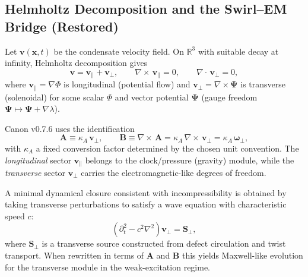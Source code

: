 \documentclass[10pt]{article}
\newcommand{\curlop}{\nabla\times}
\newcommand{\gradop}{\nabla}
\newcommand{\divop}{\nabla\cdot}
\begin{document}
    \subsection{Helmholtz Decomposition and the Swirl--EM Bridge (Restored)}
    \label{sec:helmholtz_em}

    Let $\mathbf{v}(\mathbf{x},t)$ be the condensate velocity field. On $\mathbb{R}^3$ with
    suitable decay at infinity, Helmholtz decomposition gives
    \begin{equation}
        \mathbf{v} = \mathbf{v}_{\parallel} + \mathbf{v}_{\perp},
        \qquad
        \curlop\,\mathbf{v}_{\parallel}=0,
        \qquad
        \divop\,\mathbf{v}_{\perp}=0,
        \label{eq:helmholtz_decomp}
    \end{equation}
    where $\mathbf{v}_{\parallel}=\gradop \Phi$ is longitudinal (potential flow) and
    $\mathbf{v}_{\perp}=\curlop \mathbf{\Psi}$ is transverse (solenoidal) for some
    scalar $\Phi$ and vector potential $\mathbf{\Psi}$ (gauge freedom $\mathbf{\Psi}\mapsto
    \mathbf{\Psi}+\gradop\lambda$).

    Canon v0.7.6 uses the identification
    \begin{equation}
        \mathbf{A} \equiv \kappa_A\,\mathbf{v}_{\perp},
        \qquad
        \mathbf{B} \equiv \curlop\,\mathbf{A}=\kappa_A\,\curlop\,\mathbf{v}_{\perp}
        =\kappa_A\,\boldsymbol{\omega}_{\perp},
        \label{eq:AB_from_vperp}
    \end{equation}
    with $\kappa_A$ a fixed conversion factor determined by the chosen unit convention.
    The \emph{longitudinal} sector $\mathbf{v}_{\parallel}$ belongs to the clock/pressure
    (gravity) module, while the \emph{transverse} sector $\mathbf{v}_{\perp}$ carries
    the electromagnetic-like degrees of freedom.

    A minimal dynamical closure consistent with incompressibility is obtained by taking
    transverse perturbations to satisfy a wave equation with characteristic speed $c$:
    \begin{equation}
        \left(\partial_t^2 - c^2 \nabla^2\right)\mathbf{v}_{\perp}= \mathbf{S}_{\perp},
        \label{eq:vperp_wave}
    \end{equation}
    where $\mathbf{S}_{\perp}$ is a transverse source constructed from defect circulation
    and twist transport. When rewritten in terms of $\mathbf{A}$ and $\mathbf{B}$ this
    yields Maxwell-like evolution for the transverse module in the weak-excitation regime.
\end{document}
